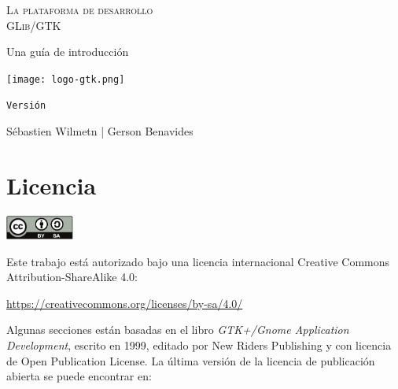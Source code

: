 \begin{titlepage}
    \begin{center}
        \afterpage{\restorepagecolor}
        
        \vspace*{0.64cm}
        
        \textsc{
            \Huge La plataforma de desarrollo\\[0.32cm]
            GLib/GTK
        }
        
        \vspace{0.64cm}
        
        \textrm{\Large Una guía de introducción}
        
        \vspace{1.28cm}
        
        \texttt{[image: logo-gtk.png]}
        
        \vspace{1.92cm}

        \texttt{\large Versión \bookversion}

        \vfill
            
        {\large Sébastien Wilmetn | Gerson Benavides}
    \end{center}
\end{titlepage}

\mbox{}

\vfill

\section{Licencia}
    \label{intro-license}
    
    \begin{center}
        \includegraphics[height=0.8cm]{assets/img/creative-commons.pdf}
    \end{center}
    
    \noindent
    Este trabajo está autorizado bajo una licencia internacional Creative Commons Attribution-ShareAlike 4.0:
    
    \url{https://creativecommons.org/licenses/by-sa/4.0/}
    
    \vspace{0.16cm}
    
    \noindent
    Algunas secciones están basadas en el libro \emph{GTK+/Gnome Application Development}, escrito en 1999, editado por New Riders Publishing y con licencia de Open Publication License. La última versión de la licencia de publicación abierta se puede encontrar en:
    

